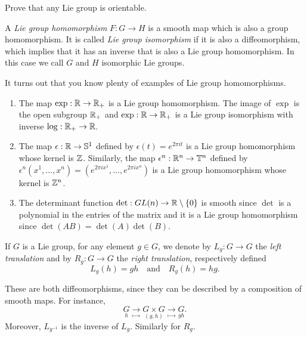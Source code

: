\begin{exercise}
	Prove that any Lie group is orientable.
\end{exercise}

\begin{definition}
	A \emph{Lie group homomorphism} $F:G\to H$ is a smooth map which is also a group homomorphism. It is called \emph{Lie group isomorphism} if it is also a diffeomorphism, which implies that it has an inverse that is also a Lie group homomorphism. In this case we call $G$ and $H$ isomorphic Lie groups.
\end{definition}

\begin{example}
	It turns out that you know plenty of examples of Lie group homomorphisms.
	\begin{enumerate}
		\item The map $\exp:\mathbb{R}\to\mathbb{R}_+$ is a Lie group homomorphism. The image of $\exp$ is the open subgroup $\mathbb{R}_+$ and $\exp:\mathbb{R}\to\mathbb{R}_+$ is a Lie group isomorphism with inverse $\log:\mathbb{R}_+\to\mathbb{R}$.
		\item The map $\epsilon:\mathbb{R}\to\mathbb{S}^1$ defined by $\epsilon(t)=e^{2\pi i t}$ is a Lie group homomorphism whose kernel is $\mathbb{Z}$. Similarly, the map $\epsilon^n:\mathbb{R}^n\to\mathbb{T}^n$ defined by $\epsilon^n(x^1, \ldots, x^n)=(e^{2\pi i x^1}, \ldots, e^{2\pi i x^n})$ is a Lie group homomorphism whose kernel is $\mathbb{Z}^n$.
		\item The determinant function $\det:GL(n)\to\mathbb{R}\setminus\{0\}$ is smooth since $\det$ is a polynomial in the entries of the matrix and it is a Lie group homomorphism since $\det (AB) = \det(A) \det(B)$.
	\end{enumerate}
\end{example}

\begin{definition}
	If $G$ is a Lie group, for any element $g\in G$, we denote by $L_g:G\to G$ the \emph{left translation} and by $R_g:G\to G$ the \emph{right translation}, respectively defined
	\begin{equation}
		L_g(h) = gh
		\quad\mbox{and}\quad
		R_g(h) = hg.
	\end{equation}
\end{definition}

These are both diffeomorphisms, since they can be described by a composition of smooth maps. For instance,
\begin{equation}
	\underset{h}{G} \underset{\mapsto}{\to} \underset{(g,h)}{G\times G} \underset{\mapsto}{\to} \underset{gh}{G}.
\end{equation}
Moreover, $L_{g^{-1}}$ is the inverse of $L_g$.
Similarly for $R_g$.

